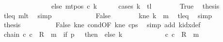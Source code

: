 \begin{isabellebody}
\ \ \ \ \ \ \ \ \ \ \ \ \ \ \ else\ mt{\isacharunderscore}{\kern0pt}pos\ c{}\ k{\isacharparenright}{\kern0pt}{\isachardoublequoteclose}\isanewline
\ \ \ \ \isamarkupfalse%
\ {\isacharparenleft}{\kern0pt}cases\ {\isachardoublequoteopen}k\ {\isacharequal}{\kern0pt}\ {\isacharquery}{\kern0pt}tl{\isachardoublequoteclose}{\isacharparenright}{\kern0pt}\isanewline
\ \ \ \ \ \ \isamarkupfalse%
\ True\ \isamarkupfalse%
\ {\isacharquery}{\kern0pt}thesis\ \isamarkupfalse%
\ tl{\isacharunderscore}{\kern0pt}eq\ m{}lt\ \isamarkupfalse%
\ simp\isanewline
\ \ \ \ \isamarkupfalse%
\isanewline
\ \ \ \ \ \ \isamarkupfalse%
\ False\isanewline
\ \ \ \ \ \ \isamarkupfalse%
\ kne{\isacharcolon}{\kern0pt}\ {\isachardoublequoteopen}k\ {\isasymnoteq}\ {\isacharquery}{\kern0pt}m{}{\isachardoublequoteclose}\ \isamarkupfalse%
\ tl{\isacharunderscore}{\kern0pt}eq\ \isamarkupfalse%
\ simp\isanewline
\ \ \ \ \ \ \isamarkupfalse%
\ {\isacharquery}{\kern0pt}thesis\isanewline
\ \ \ \ \ \ \ \ \isamarkupfalse%
\ False\ kne\ cond{\isacharbrackleft}{\kern0pt}OF\ kne{\isacharbrackright}{\kern0pt}\ c{}{\isacharunderscore}{\kern0pt}ps\ \isamarkupfalse%
\ {\isacharparenleft}{\kern0pt}simp\ add{\isacharcolon}{\kern0pt}\ k{\isacharunderscore}{\kern0pt}idx{\isacharunderscore}{\kern0pt}def{\isacharparenright}{\kern0pt}\isanewline
\ \ \ \ \isamarkupfalse%
\isanewline
\ \ \isamarkupfalse%
\isanewline
\ \ \isamarkupfalse%
\ chain{\isacharcolon}{\kern0pt}\ {\isachardoublequoteopen}{\isacharparenleft}{\kern0pt}c{}{\isacharcomma}{\kern0pt}\ c{}{\isacharparenright}{\kern0pt}\ {\isasymin}\ R{\isacharprime}{\kern0pt}\ {\isacharcircum}{\kern0pt}{\isacharcircum}{\kern0pt}\ {\isacharparenleft}{\kern0pt}m{}\ {\isacharplus}{\kern0pt}\ {\isacharparenleft}{\kern0pt}if\ {\isacharquery}{\kern0pt}p\ {\isacharequal}{\kern0pt}\ {}\ then\ {}\ else\ {\isacharquery}{\kern0pt}k\ {\isacharplus}{\kern0pt}\ {}{\isacharparenright}{\kern0pt}{\isacharparenright}{\kern0pt}{\isachardoublequoteclose}\isanewline
\ \ \isamarkupfalse%
\ {\isacharminus}{\kern0pt}\isanewline
\ \ \ \ \isamarkupfalse%
\ {\isachardoublequoteopen}{\isacharparenleft}{\kern0pt}c{}{\isacharcomma}{\kern0pt}\ c{}{\isacharparenright}{\kern0pt}\ {\isasymin}\ R{\isacharprime}{\kern0pt}\ {\isacharcircum}{\kern0pt}{\isacharcircum}{\kern0pt}\ m{}\isanewline

\end{isabellebody}
